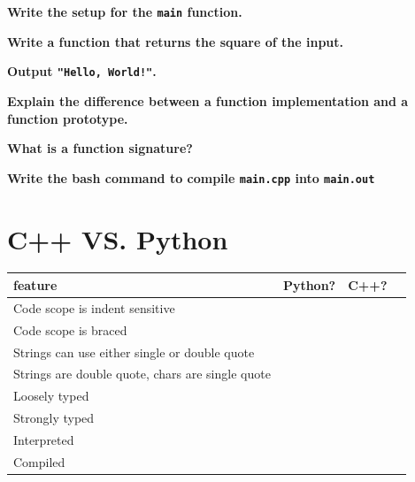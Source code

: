 \documentclass[letterpaper, 12pt]{article}
\newcommand{\question}[2][2em]{\textbf{#2}\vspace{#1}\par}
\begin{document}
\question[10em]{Write the setup for the \texttt{main} function.}

\question[8em]{Write a function that returns the square of the input.}

\question[4em]{Output \texttt{"Hello, World!"}.}

\question[4em]{Explain the difference between a function implementation and a
    function prototype.}

\question[4em]{What is a function signature?}

\question{Write the bash command to compile \texttt{main.cpp} into \texttt{main.out}}

\section{C++ VS. Python}

\begin{tabular}{| l | c | c | c |}
    \hline
    \textbf{feature} & \textbf{Python?} & \textbf{C++?} \\
    \hline
    Code scope is indent sensitive & & \\
    \hline
    Code scope is braced & & \\
    \hline
    Strings can use either single or double quote & & \\
    \hline
    Strings are double quote, chars are single quote & & \\
    \hline
    Loosely typed & & \\
    \hline
    Strongly typed & & \\
    \hline
    Interpreted & & \\
    \hline
    Compiled & & \\
    \hline
\end{tabular}
\end{document}
